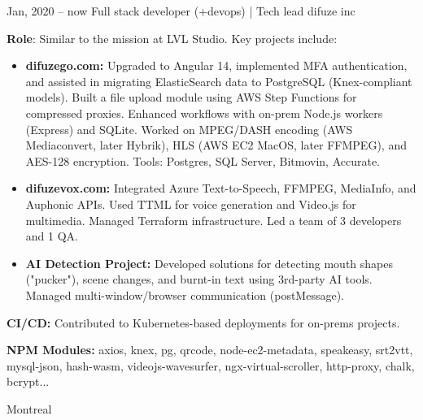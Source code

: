 \documentclass[
  a4paper,
   maincolor=cvblue,
   sectioncolor=cvblue,
   sidebarwidth=0.323\paperwidth,
]{fortysecondscv}
\begin{document}
\newpage
\restoregeometry
{}\paperwidth

\makefrontsidebar

\vspace*{-3.5em} %



\begin{cvtableNew}
  \cvitemRightNew
      {Jan, 2020 – now} %
      {Full stack developer (+devops) | Tech lead} %
      {difuze inc} %
      {
        \vspace{0.1pt} %
        \fontsize{10.8pt}{12pt}\selectfont %
        \textbf{Role}: Similar to the mission at LVL Studio. Key projects include:\vspace{5pt}

        \begin{itemize}[itemsep=-1mm, topsep=0pt, leftmargin=8pt]
          \item \textbf{difuzego.com:} Upgraded to Angular 14, implemented MFA authentication, and assisted in migrating ElasticSearch data to PostgreSQL (Knex-compliant models). Built a file upload module using AWS Step Functions for compressed proxies. Enhanced workflows with on-prem Node.js workers (Express) and SQLite. Worked on MPEG/DASH encoding (AWS Mediaconvert, later Hybrik), HLS (AWS EC2 MacOS, later FFMPEG), and AES-128 encryption. Tools: Postgres, SQL Server, Bitmovin, Accurate.\vspace{5pt}
          \item \textbf{difuzevox.com:} Integrated Azure Text-to-Speech, FFMPEG, MediaInfo, and Auphonic APIs. Used TTML for voice generation and Video.js for multimedia. Managed Terraform infrastructure. Led a team of 3 developers and 1 QA.\vspace{5pt}
          \item \textbf{AI Detection Project:} Developed solutions for detecting mouth shapes ("pucker"), scene changes, and burnt-in text using 3rd-party AI tools. Managed multi-window/browser communication (postMessage).\vspace{5pt}
        \end{itemize}

        \textbf{CI/CD:} Contributed to Kubernetes-based deployments for on-prems projects.\vspace{5pt}

        \textbf{NPM Modules:} axios, knex, pg, qrcode, node-ec2-metadata, speakeasy, srt2vtt, mysql-json, hash-wasm, videojs-wavesurfer, ngx-virtual-scroller, http-proxy, chalk, bcrypt...
      }
      {Montreal} %
\end{cvtableNew}
\end{document}
